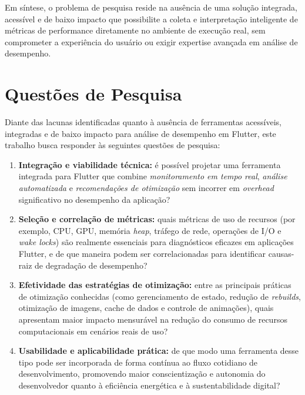 \documentclass[12pt,a4paper,oneside]{abntex2}
\begin{document}
Em síntese, o problema de pesquisa reside na ausência de uma solução integrada, acessível e de baixo impacto que possibilite a coleta e interpretação inteligente de métricas de performance diretamente no ambiente de execução real, sem comprometer a experiência do usuário ou exigir expertise avançada em análise de desempenho.


\section{Questões de Pesquisa}

Diante das lacunas identificadas quanto à ausência de ferramentas acessíveis, integradas e de baixo impacto para análise de desempenho em Flutter, este trabalho busca responder às seguintes questões de pesquisa:

\begin{enumerate}
  \item \textbf{Integração e viabilidade técnica:} é possível projetar uma ferramenta integrada para Flutter que combine \textit{monitoramento em tempo real}, \textit{análise automatizada} e \textit{recomendações de otimização} sem incorrer em \textit{overhead} significativo no desempenho da aplicação?
  
  \item \textbf{Seleção e correlação de métricas:} quais métricas de uso de recursos (por exemplo, CPU, GPU, memória \textit{heap}, tráfego de rede, operações de I/O e \textit{wake locks}) são realmente essenciais para diagnósticos eficazes em aplicações Flutter, e de que maneira podem ser correlacionadas para identificar causas-raiz de degradação de desempenho?
  
  \item \textbf{Efetividade das estratégias de otimização:} entre as principais práticas de otimização conhecidas (como gerenciamento de estado, redução de \textit{rebuilds}, otimização de imagens, cache de dados e controle de animações), quais apresentam maior impacto mensurável na redução do consumo de recursos computacionais em cenários reais de uso?
  
  \item \textbf{Usabilidade e aplicabilidade prática:} de que modo uma ferramenta desse tipo pode ser incorporada de forma contínua ao fluxo cotidiano de desenvolvimento, promovendo maior conscientização e autonomia do desenvolvedor quanto à eficiência energética e à sustentabilidade digital?
\end{enumerate}
\end{document}
